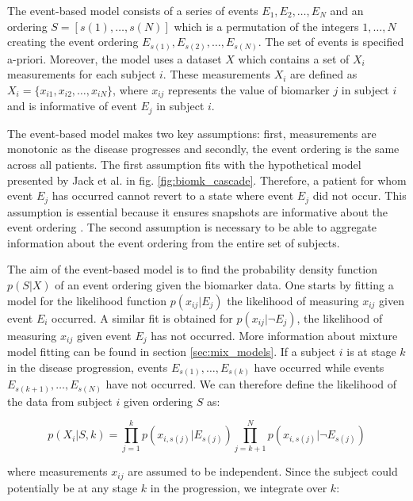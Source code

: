 The event-based model consists of a series of events $E_1, E_2, \dots , E_N$ and an ordering $S = [s(1), \dots, s(N)]$ which is a permutation of the integers $1,\dots, N$ creating the event ordering $E_{s(1)}, E_{s(2)},\dots, E_{s(N)}$. The set of events is specified a-priori.  Moreover, the model uses a dataset $X$ which contains a set of $X_i$ measurements for each subject $i$. These measurements $X_i$ are defined as $X_i = \{x_{i1}, x_{i2}, \dots, x_{iN}\}$, where $x_{ij}$ represents the value of biomarker $j$ in subject $i$ and is informative of event $E_j$ in subject $i$. 

The event-based model makes two key assumptions: first, measurements are monotonic as the disease progresses and secondly, the event ordering is the same across all patients. The first assumption fits with the hypothetical model presented by Jack et al. \cite{jack2010hypothetical} in fig. \ref{fig:biomk_cascade}. Therefore, a patient for whom event $E_j$ has occurred cannot revert to a state where event $E_j$ did not occur. This assumption is essential because it ensures snapshots are informative about the event ordering \cite{fonteijn2012event}. The second assumption is necessary to be able to aggregate information about the event ordering from the entire set of subjects. 

The aim of the event-based model is to find the probability density function $p(S|X)$ of an event ordering given the biomarker data. One starts by fitting a model for the likelihood function $p(x_{ij}|E_j)$ the likelihood of measuring $x_{ij}$ given event $E_i$ occurred. A similar fit is obtained for $p(x_{ij}|\neg E_j)$, the likelihood of measuring $x_{ij}$ given event $E_j$ has not occurred. More information about mixture model fitting can be found in section \ref{sec:mix_models}. If a subject $i$ is at stage $k$ in the disease progression, events $E_{s(1)},\dots, E_{s(k)}$ have occurred while events $E_{s(k+1)},\dots, E_{s(N)}$ have not occurred. We can therefore define the likelihood of the data from subject $i$ given ordering $S$ as:

\begin{equation}
\label{eq:ebm1}
 p(X_i | S, k) = \prod_{j=1}^k p\left(x_{i,s(j)} | E_{s(j)} \right) \prod_{j=k+1}^N p\left(x_{i,s(j)} | \neg E_{s(j)}\right)
\end{equation}
 
where measurements $x_{ij}$ are assumed to be independent. Since the subject could potentially be at any stage $k$ in the progression, we integrate over $k$:

